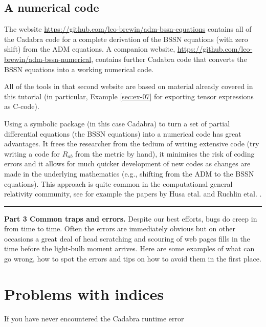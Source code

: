 \documentclass[a4paper,12pt]{article}
\numberwithin{equation}{section}%
\begin{document}
\subsection{A numerical code}

The website \url{https://github.com/leo-brewin/adm-bssn-equations} contains all of the
Cadabra code for a complete derivation of the BSSN equations (with zero shift) from the ADM
equations. A companion website, \url{https://github.com/leo-brewin/adm-bssn-numerical},
contains further Cadabra code that converts the BSSN equations into a working numerical code.

All of the tools in that second website are based on material already covered in this
tutorial (in particular, Example \ref{sec:ex-07} for exporting tensor expressions as C-code).

Using a symbolic package (in this case Cadabra) to turn a set of partial differential
equations (the BSSN equations) into a numerical code has great advantages. It frees the
researcher from the tedium of writing extensive code (try writing a code for $R_{ab}$ from
the metric by hand), it minimises the risk of coding errors and it allows for much quicker
development of new codes as changes are made in the underlying mathematics (e.g., shifting
from the ADM to the BSSN equations). This approach is quite common in the computational
general relativity community, see for example the papers by Husa etal. \cite{husa:2006-01}
and Ruchlin etal. \cite{ruchlin:2018-01}.

\clearpage

\hrule height 0pt
\vskip 4cm
{\Huge\bf Part 3 Common traps and errors.}
\vskip 2cm
Despite our best efforts, bugs do creep in from time to time. Often the errors are
immediately obvious but on other occasions a great deal of head scratching and scouring of
web pages fills in the time before the light-bulb moment arrives. Here are some examples of
what can go wrong, how to spot the errors and tips on how to avoid them in the first place.

\clearpage

\section*{Problems with indices}
If you have never encountered the Cadabra runtime error
\end{document}

